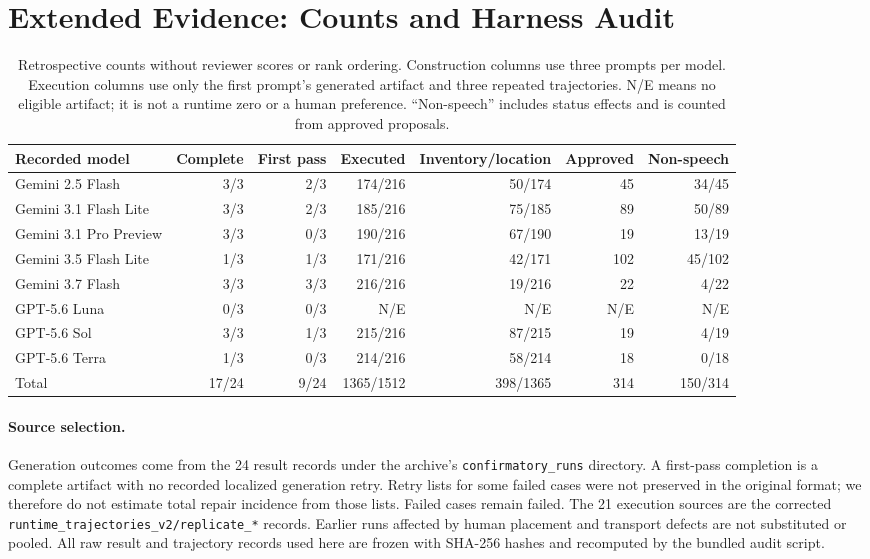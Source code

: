 \section{Extended Evidence: Counts and Harness Audit}
\label{app:extended}

\begin{table}[t]
\centering\small
\setlength{\tabcolsep}{5pt}
\begin{tabularx}{\textwidth}{@{}Yrrrrrr@{}}
\toprule
Recorded model & Complete & First pass & Executed & Inventory/location & Approved & Non-speech \\
\midrule
Gemini 2.5 Flash & 3/3 & 2/3 & 174/216 & 50/174 & 45 & 34/45 \\
Gemini 3.1 Flash Lite & 3/3 & 2/3 & 185/216 & 75/185 & 89 & 50/89 \\
Gemini 3.1 Pro Preview & 3/3 & 0/3 & 190/216 & 67/190 & 19 & 13/19 \\
Gemini 3.5 Flash Lite & 1/3 & 1/3 & 171/216 & 42/171 & 102 & 45/102 \\
Gemini 3.7 Flash & 3/3 & 3/3 & 216/216 & 19/216 & 22 & 4/22 \\
GPT-5.6 Luna & 0/3 & 0/3 & N/E & N/E & N/E & N/E \\
GPT-5.6 Sol & 3/3 & 1/3 & 215/216 & 87/215 & 19 & 4/19 \\
GPT-5.6 Terra & 1/3 & 0/3 & 214/216 & 58/214 & 18 & 0/18 \\
\midrule
Total & 17/24 & 9/24 & 1365/1512 & 398/1365 & 314 & 150/314 \\
\bottomrule
\end{tabularx}
\caption{Retrospective counts without reviewer scores or rank ordering.
Construction columns use three prompts per model. Execution columns use only
the first prompt's generated artifact and three repeated trajectories.
N/E means no eligible artifact; it is not a runtime zero or a human preference.
``Non-speech'' includes status effects and is counted from approved proposals.}
\label{tab:extended-audit}
\end{table}

\paragraph{Source selection.}
Generation outcomes come from the 24 result records under the archive's
\texttt{confirmatory\_runs} directory. A first-pass completion is a complete
artifact with no recorded localized generation retry. Retry lists for some
failed cases were not preserved in the original format; we therefore do not
estimate total repair incidence from those lists. Failed cases remain failed.
The 21 execution sources are the corrected
\texttt{runtime\_trajectories\_v2/replicate\_*} records. Earlier runs affected
by human placement and transport defects are not substituted or pooled.
All raw result and trajectory records used here are frozen with SHA-256 hashes
and recomputed by the bundled audit script.

